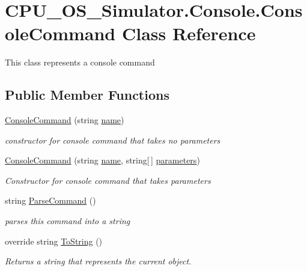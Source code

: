 \hypertarget{class_c_p_u___o_s___simulator_1_1_console_1_1_console_command}{}\section{C\+P\+U\+\_\+\+O\+S\+\_\+\+Simulator.\+Console.\+Console\+Command Class Reference}
\label{class_c_p_u___o_s___simulator_1_1_console_1_1_console_command}


This class represents a console command  


\subsection*{Public Member Functions}
\begin{DoxyCompactItemize}
\item 
\hyperlink{class_c_p_u___o_s___simulator_1_1_console_1_1_console_command_a8e1109932fa1d320557dba1a919b490d}{Console\+Command} (string \hyperlink{class_c_p_u___o_s___simulator_1_1_console_1_1_console_command_a0ba819d58268ef4f9bab12089a9fd1a4}{name})
\begin{DoxyCompactList}\small\item\em constructor for console command that takes no parameters \end{DoxyCompactList}\item 
\hyperlink{class_c_p_u___o_s___simulator_1_1_console_1_1_console_command_abaf87cf5c18c25a75a90726749bf0c6c}{Console\+Command} (string \hyperlink{class_c_p_u___o_s___simulator_1_1_console_1_1_console_command_a0ba819d58268ef4f9bab12089a9fd1a4}{name}, string\mbox{[}$\,$\mbox{]} \hyperlink{class_c_p_u___o_s___simulator_1_1_console_1_1_console_command_a00586d96461c740fd20069c604424c22}{parameters})
\begin{DoxyCompactList}\small\item\em Constructor for console command that takes parameters \end{DoxyCompactList}\item 
string \hyperlink{class_c_p_u___o_s___simulator_1_1_console_1_1_console_command_a0b953140f2c048bf7a80646e27c11435}{Parse\+Command} ()
\begin{DoxyCompactList}\small\item\em parses this command into a string \end{DoxyCompactList}\item 
override string \hyperlink{class_c_p_u___o_s___simulator_1_1_console_1_1_console_command_a21c731f1740bca4acad2a1c2a7f3d765}{To\+String} ()
\begin{DoxyCompactList}\small\item\em Returns a string that represents the current object. \end{DoxyCompactList}\end{DoxyCompactItemize}
